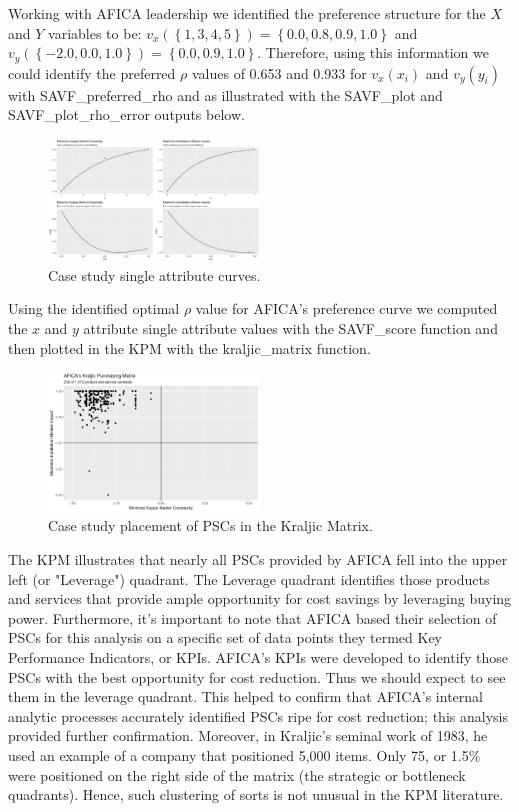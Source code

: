 \documentclass[twocolumn]{svjour3}       %
\begin{document}
Working with AFICA leadership we identified the preference structure for the $X$ and $Y$ variables to be: $v_x\left(\left\{1, 3, 4, 5\right\}\right) = \left\{0.0, 0.8, 0.9, 1.0\right\}$ and $v_y\left(\left\{-2.0, 0.0, 1.0\right\}\right) = \left\{0.0, 0.9, 1.0\right\}$. Therefore, using this information we could identify the preferred $\rho$ values of 0.653 and 0.933 for $v_x\left(x_i\right)$ and $v_y\left(y_i\right)$ with SAVF\_preferred\_rho and as illustrated with the SAVF\_plot and SAVF\_plot\_rho\_error outputs below.

\begin{figure}[!htb]
  \includegraphics[width=0.5\textwidth]{fig6.png}
  \caption{Case study single attribute curves.}
  \label{fig:6}
\end{figure}

Using the identified optimal $\rho$ value for AFICA's preference curve we computed the $x$ and $y$ attribute single attribute values with the SAVF\_score function and then plotted in the KPM with the kraljic\_matrix function.

\begin{figure}[!htb]
  \includegraphics[width=0.5\textwidth]{fig7.png}
  \caption{Case study placement of PSCs in the Kraljic Matrix.}
  \label{fig:7}
\end{figure}

The KPM illustrates that nearly all PSCs provided by AFICA fell into the upper left (or "Leverage") quadrant.  The Leverage quadrant identifies those products and services that provide ample opportunity for cost savings by leveraging buying power.  Furthermore, it's important to note that AFICA based their selection of PSCs for this analysis on a specific set of data points they termed Key Performance Indicators, or KPIs. AFICA's KPIs were developed to identify those PSCs with the best opportunity for cost reduction. Thus we should expect to see them in the leverage quadrant. This helped to confirm that AFICA's internal analytic processes accurately identified PSCs ripe for cost reduction; this analysis provided further confirmation. Moreover, in Kraljic's seminal work of 1983, he used an example of a company that positioned 5,000 items. Only 75, or 1.5\% were positioned on the right side of the matrix (the strategic or bottleneck quadrants). Hence, such clustering of sorts is not unusual in the KPM literature. 
\end{document}
